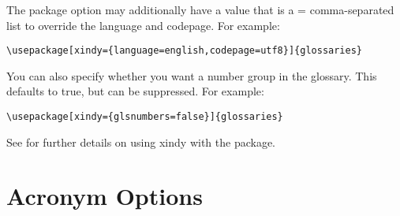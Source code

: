 \documentclass[report]{nlctdoc}
\begin{document}
\begin{description}
The  package option may additionally have a value that
is a = comma-separated list to override the
language and codepage. For example:
\begin{verbatim}
\usepackage[xindy={language=english,codepage=utf8}]{glossaries}
\end{verbatim}
You can also specify whether you want a number group in the
glossary. This defaults to true, but can be suppressed. For example:
\begin{verbatim}
\usepackage[xindy={glsnumbers=false}]{glossaries}
\end{verbatim}
See  for further details on using \gls{xindy}
with the  package.

\end{description}

\section{Acronym Options}
\label{sec:pkgopts-acronym}
\end{document}
